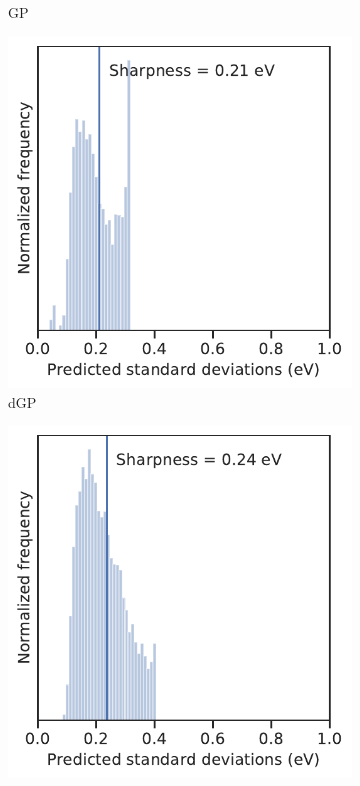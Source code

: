 \documentclass[]{achemso}
\begin{document}
\begin{figure}
\begin{subfigure}{0.32\textwidth}
        \caption{\gls{GP}}\label{fig:sharpness_gp}
    \end{subfigure}
    \begin{subfigure}{0.32\textwidth}
        \includegraphics[width=\textwidth]{../GPnnm/Matern/sharpness.pdf}
        \caption{\gls{dGP}}\label{fig:sharpness_dgp}
    \end{subfigure}
    \begin{subfigure}{0.32\textwidth}
        \includegraphics[width=\textwidth]{../CFGP/Matern/sharpness.pdf}

\end{subfigure}
\end{figure}
\end{document}
